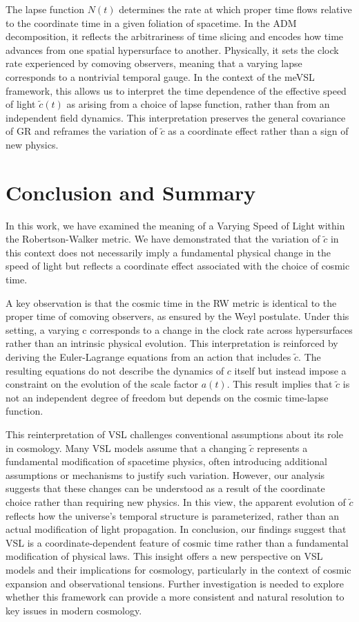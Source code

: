 \documentclass[jkps,preprint,fleqn]{revtex4} %
\newcommand{\tc}{\tilde{c}}
\begin{document}
The lapse function $N(t)$ determines the rate at which proper time flows relative to the coordinate time in a given foliation of spacetime. In the ADM decomposition, it reflects the arbitrariness of time slicing and encodes how time advances from one spatial hypersurface to another. Physically, it sets the clock rate experienced by comoving observers, meaning that a varying lapse corresponds to a nontrivial temporal gauge. In the context of the meVSL framework, this allows us to interpret the time dependence of the effective speed of light $\tc(t)$ as arising from a choice of lapse function, rather than from an independent field dynamics. This interpretation preserves the general covariance of GR and reframes the variation of $\tc$ as a coordinate effect rather than a sign of new physics.

\section{Conclusion and Summary}\label{sec:Conc}

In this work, we have examined the meaning of a Varying Speed of Light within the Robertson-Walker metric. We have demonstrated that the variation of $\tc$ in this context does not necessarily imply a fundamental physical change in the speed of light but reflects a coordinate effect associated with the choice of cosmic time.

A key observation is that the cosmic time in the RW metric is identical to the proper time of comoving observers, as ensured by the Weyl postulate. Under this setting, a varying c corresponds to a change in the clock rate across hypersurfaces rather than an intrinsic physical evolution. This interpretation is reinforced by deriving the Euler-Lagrange equations from an action that includes $\tc$. The resulting equations do not describe the dynamics of $c$ itself but instead impose a constraint on the evolution of the scale factor $a(t)$. This result implies that $\tc$ is not an independent degree of freedom but depends on the cosmic time-lapse function.

This reinterpretation of VSL challenges conventional assumptions about its role in cosmology. Many VSL models assume that a changing $\tc$ represents a fundamental modification of spacetime physics, often introducing additional assumptions or mechanisms to justify such variation. However, our analysis suggests that these changes can be understood as a result of the coordinate choice rather than requiring new physics. In this view, the apparent evolution of $\tc$ reflects how the universe's temporal structure is parameterized, rather than an actual modification of light propagation.
In conclusion, our findings suggest that VSL is a coordinate-dependent feature of cosmic time rather than a fundamental modification of physical laws. This insight offers a new perspective on VSL models and their implications for cosmology, particularly in the context of cosmic expansion and observational tensions. Further investigation is needed to explore whether this framework can provide a more consistent and natural resolution to key issues in modern cosmology.
\end{document}
